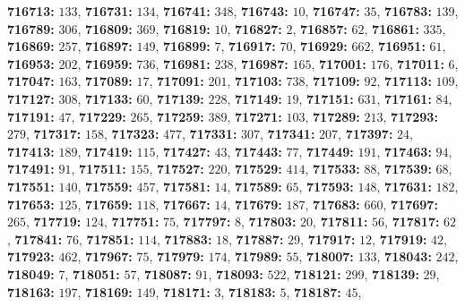 \textsf{\bfseries 716713:} $133$, \textsf{\bfseries 716731:} $134$, \textsf{\bfseries 716741:} $348$, \textsf{\bfseries 716743:} $10$, \textsf{\bfseries 716747:} $35$, \textsf{\bfseries 716783:} $139$, \textsf{\bfseries 716789:} $306$, \textsf{\bfseries 716809:} $369$, \textsf{\bfseries 716819:} $10$, \textsf{\bfseries 716827:} $2$, \textsf{\bfseries 716857:} $62$, \textsf{\bfseries 716861:} $335$, \textsf{\bfseries 716869:} $257$, \textsf{\bfseries 716897:} $149$, \textsf{\bfseries 716899:} $7$, \textsf{\bfseries 716917:} $70$, \textsf{\bfseries 716929:} $662$, \textsf{\bfseries 716951:} $61$, \textsf{\bfseries 716953:} $202$, \textsf{\bfseries 716959:} $736$, \textsf{\bfseries 716981:} $238$, \textsf{\bfseries 716987:} $165$, \textsf{\bfseries 717001:} $176$, \textsf{\bfseries 717011:} $6$, \textsf{\bfseries 717047:} $163$, \textsf{\bfseries 717089:} $17$, \textsf{\bfseries 717091:} $201$, \textsf{\bfseries 717103:} $738$, \textsf{\bfseries 717109:} $92$, \textsf{\bfseries 717113:} $109$, \textsf{\bfseries 717127:} $308$, \textsf{\bfseries 717133:} $60$, \textsf{\bfseries 717139:} $228$, \textsf{\bfseries 717149:} $19$, \textsf{\bfseries 717151:} $631$, \textsf{\bfseries 717161:} $84$, \textsf{\bfseries 717191:} $47$, \textsf{\bfseries 717229:} $265$, \textsf{\bfseries 717259:} $389$, \textsf{\bfseries 717271:} $103$, \textsf{\bfseries 717289:} $213$, \textsf{\bfseries 717293:} $279$, \textsf{\bfseries 717317:} $158$, \textsf{\bfseries 717323:} $477$, \textsf{\bfseries 717331:} $307$, \textsf{\bfseries 717341:} $207$, \textsf{\bfseries 717397:} $24$, \textsf{\bfseries 717413:} $189$, \textsf{\bfseries 717419:} $115$, \textsf{\bfseries 717427:} $43$, \textsf{\bfseries 717443:} $77$, \textsf{\bfseries 717449:} $191$, \textsf{\bfseries 717463:} $94$, \textsf{\bfseries 717491:} $91$, \textsf{\bfseries 717511:} $155$, \textsf{\bfseries 717527:} $220$, \textsf{\bfseries 717529:} $414$, \textsf{\bfseries 717533:} $88$, \textsf{\bfseries 717539:} $68$, \textsf{\bfseries 717551:} $140$, \textsf{\bfseries 717559:} $457$, \textsf{\bfseries 717581:} $14$, \textsf{\bfseries 717589:} $65$, \textsf{\bfseries 717593:} $148$, \textsf{\bfseries 717631:} $182$, \textsf{\bfseries 717653:} $125$, \textsf{\bfseries 717659:} $118$, \textsf{\bfseries 717667:} $14$, \textsf{\bfseries 717679:} $187$, \textsf{\bfseries 717683:} $660$, \textsf{\bfseries 717697:} $265$, \textsf{\bfseries 717719:} $124$, \textsf{\bfseries 717751:} $75$, \textsf{\bfseries 717797:} $8$, \textsf{\bfseries 717803:} $20$, \textsf{\bfseries 717811:} $56$, \textsf{\bfseries 717817:} $62$, \textsf{\bfseries 717841:} $76$, \textsf{\bfseries 717851:} $114$, \textsf{\bfseries 717883:} $18$, \textsf{\bfseries 717887:} $29$, \textsf{\bfseries 717917:} $12$, \textsf{\bfseries 717919:} $42$, \textsf{\bfseries 717923:} $462$, \textsf{\bfseries 717967:} $75$, \textsf{\bfseries 717979:} $174$, \textsf{\bfseries 717989:} $55$, \textsf{\bfseries 718007:} $133$, \textsf{\bfseries 718043:} $242$, \textsf{\bfseries 718049:} $7$, \textsf{\bfseries 718051:} $57$, \textsf{\bfseries 718087:} $91$, \textsf{\bfseries 718093:} $522$, \textsf{\bfseries 718121:} $299$, \textsf{\bfseries 718139:} $29$, \textsf{\bfseries 718163:} $197$, \textsf{\bfseries 718169:} $149$, \textsf{\bfseries 718171:} $3$, \textsf{\bfseries 718183:} $5$, \textsf{\bfseries 718187:} $45$, 
